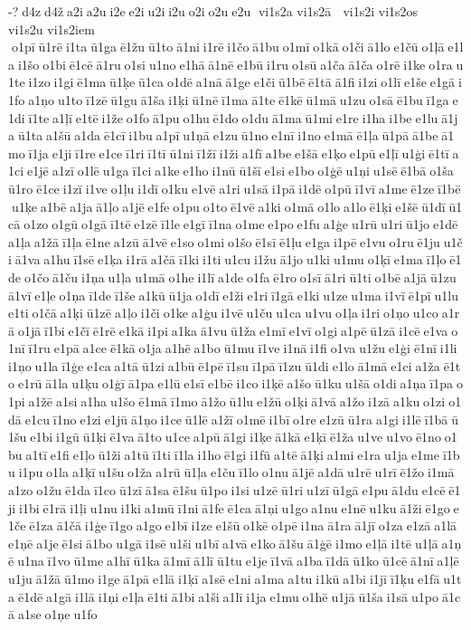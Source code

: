 -? d4z d4ž a2i a2u i2e e2i u2i i2u o2i o2u e2u  vi1s2a  	 vi1s2ā   vi1s2i  	 vi1s2os   vi1s2u  
 vi1s2iem  o1pī ū1rē i1ta ū1ga ē1žu ū1to ā1ni i1rē i1čo ā1bu o1mī o1kā o1či ā1lo e1čū o1ļā e1la i1šo o1bi ē1cē ā1ru o1si u1no e1hā ā1nē e1bū i1ru o1sū a1ča ā1ča o1rē i1ke o1ra u1te i1zo i1gi ē1ma ū1ķe ū1ca o1dē a1nā ā1ge e1či ū1bē ē1tā ā1fi i1zi o1lī e1še e1gā i1fo a1ņo u1to ī1zē ū1gu ā1ša i1ķi ū1nē ī1ma ā1te ē1kē ū1mā u1zu o1sā ē1bu ī1ga e1di ī1te a1ļī e1tē i1že o1fo ā1pu o1hu ē1do o1du ā1ma ū1mi e1re i1ha i1be e1lu ā1ja ū1ta a1šū a1da ē1cī i1bu a1pī u1ņā e1zu ū1no e1nī i1no e1mā ē1ļa ū1pā ā1be ā1mo ī1ja e1ji ī1re e1ce ī1ri ī1tī ū1ni ī1žī i1ži a1fī a1be e1šā e1ķo e1pū e1ļī u1ģi ē1tī a1ci e1jē a1zī o1lē u1ga ī1ci a1ke e1ho i1nū ū1šī e1si e1bo o1ģē u1ņi u1sē ē1bā o1ša ū1ro ē1ce i1zī i1ve o1ļu i1dī o1ku e1vē a1ri u1sā i1pā i1dē o1pū ī1vī a1me ē1ze ī1bē u1ķe a1bē a1ja ā1ļo a1jē e1fe o1pu o1to ē1vē a1ki o1mā o1lo a1lo ē1ķi e1šē ū1dī ū1cā o1zo o1gū o1gā ī1tē e1zē ī1le e1gī ī1na o1me e1po e1fu a1ģe u1rū u1ri ū1jo e1dē a1ļa a1žā ī1ļa ē1ne a1zū ā1vē e1so o1mi o1šo ē1sī ē1ļu e1ga i1pē e1vu o1ru ē1ju u1či ā1va a1hu ī1sē e1ķa i1rā a1čā ī1ki i1ti u1cu i1žu ā1jo u1ki u1mu o1ķī e1ma ī1ļo ē1de o1čo ā1ču i1ņa u1ļa u1mā o1he i1lī a1de o1fa ē1ro o1sī ā1ri ū1ti o1bē a1jā ū1zu ā1vī e1ļe o1ņa ī1de ī1še a1kū ū1ja o1dī e1ži e1ri ī1gā e1ki u1ze u1ma i1vī ē1pī u1lu e1ti o1čā a1ķi ū1zē a1ļo i1či o1ke a1ģu i1vē u1ču u1ca u1vu o1ļa i1ri o1ņo u1co a1rā o1jā ī1bi e1čī ē1rē e1kā i1pi a1ka ā1vu ū1ža e1mī e1vī o1gi a1pē ū1zā i1cē e1va o1nī ī1ru e1pā a1ce ē1kā o1ja a1hē a1bo ū1mu ī1ve i1nā i1fi o1va u1žu e1ģi ē1nī i1li i1ņo u1la ī1ģe e1ca a1tā ū1zi a1bū ē1pē ī1su ī1pā ī1zu ū1di e1lo ā1mā e1ci a1ža ē1to e1rū ā1la u1ķu o1ģī ā1pa e1lū e1sī e1bē i1co i1ķē a1šo ū1ku u1šā o1di a1ņa ī1pa o1pi a1žē a1si a1ha u1šo ē1mā ī1mo ā1žo ū1lu e1žū o1ķi ā1vā a1žo i1zā a1ku o1zi o1dā e1cu ī1no e1zi e1jū ā1ņo i1ce ū1lē a1žī o1mē i1bī o1re e1zū ū1ra a1gi i1lē ī1bā ū1šu e1bi i1gū ū1ķi ē1va ā1to u1ce a1pū ā1gi i1ķe ā1kā e1ķī ē1ža u1ve u1vo ē1no o1bu a1tī e1fi e1ļo ū1ži a1tū ī1ti ī1la i1ho ē1gi i1fū a1tē ā1ķi a1mi e1ra u1ja e1me ī1bu i1pu o1la a1ķī u1šu o1ža a1rū ū1ļa e1ču ī1lo o1nu ā1jē a1dā u1rē u1rī ē1žo i1mā a1zo o1žu ē1da ī1co ū1zī ā1sa ē1šu ū1po i1si u1zē ū1ri u1zī ū1gā e1pu ā1du e1cē ē1ji i1bi ē1rā i1ļi u1nu i1ki a1mū ī1ni ā1fe ē1ca ā1ņi u1go a1nu e1nē u1ku ā1ži ē1go e1če ē1za ā1čā i1ģe ī1go a1go e1bī i1ze e1šū o1kē o1pē i1na ā1ra ā1jī o1za e1zā a1lā e1ņē a1je ē1si ā1bo u1gā i1sē u1ši u1bī a1vā e1ko ā1šu ā1ģē i1mo e1ļā i1tē u1ļā a1ņē u1na ī1vo ū1me a1hī ū1ka ā1mī ā1lī ū1tu e1je ī1vā a1ba ī1dā ū1ko ū1cē ā1nī a1ļē u1ju ā1žā ū1mo i1ge ā1pā e1lā i1ķī a1sē e1ni a1ma a1tu i1kū a1bi i1jī ī1ķu e1fā u1ta ē1dē a1gā i1lā i1ņi e1ļa ē1ti ā1bi a1ši a1lī i1ja e1mu o1hē u1jā ū1ša i1sā u1po ā1cā a1se o1ņe u1fo